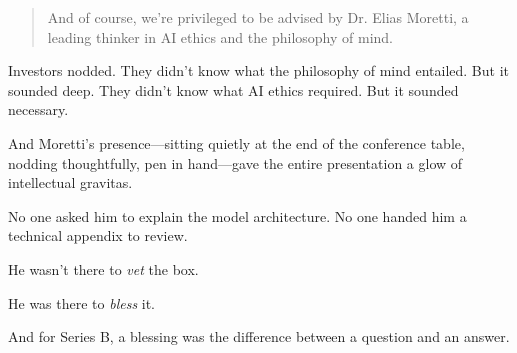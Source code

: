 \begin{quote}
And of course, we’re privileged to be advised by Dr. Elias Moretti, a leading thinker in AI ethics and the philosophy of mind.
\end{quote}

Investors nodded. They didn’t know what the philosophy of mind entailed. But it sounded deep.  
They didn’t know what AI ethics required. But it sounded necessary.

And Moretti’s presence—sitting quietly at the end of the conference table, nodding thoughtfully, pen in hand—gave the entire presentation a glow of intellectual gravitas.

No one asked him to explain the model architecture.  
No one handed him a technical appendix to review.

He wasn’t there to \textit{vet} the box.

He was there to \textit{bless} it.

And for Series B, a blessing was the difference between a question and an answer.


